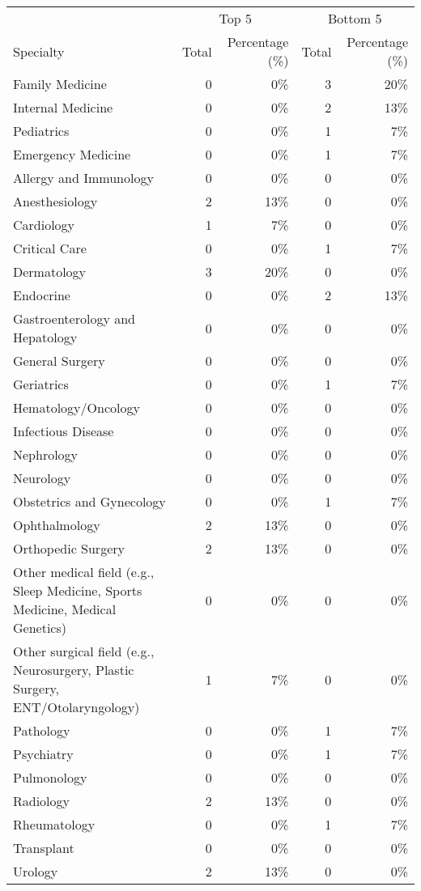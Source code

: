 \begin{tabular}{lrrrr}\toprule
 & \multicolumn{2}{c}{Top 5} & \multicolumn{2}{c}{Bottom 5} \\
\cmidrule(lr){2-3} \cmidrule(lr){4-5}
Specialty & Total & Percentage (\%) & Total & Percentage (\%) \\ \midrule
Family Medicine & 0 & 0\% & 3 & 20\% \\
Internal Medicine & 0 & 0\% & 2 & 13\% \\
Pediatrics & 0 & 0\% & 1 & 7\% \\
\midrule
Emergency Medicine & 0 & 0\% & 1 & 7\% \\
\midrule
Allergy and Immunology & 0 & 0\% & 0 & 0\% \\
Anesthesiology & 2 & 13\% & 0 & 0\% \\
Cardiology & 1 & 7\% & 0 & 0\% \\
Critical Care & 0 & 0\% & 1 & 7\% \\
Dermatology & 3 & 20\% & 0 & 0\% \\
Endocrine & 0 & 0\% & 2 & 13\% \\
Gastroenterology and Hepatology & 0 & 0\% & 0 & 0\% \\
General Surgery & 0 & 0\% & 0 & 0\% \\
Geriatrics & 0 & 0\% & 1 & 7\% \\
Hematology/Oncology & 0 & 0\% & 0 & 0\% \\
Infectious Disease & 0 & 0\% & 0 & 0\% \\
Nephrology & 0 & 0\% & 0 & 0\% \\
Neurology & 0 & 0\% & 0 & 0\% \\
Obstetrics and Gynecology & 0 & 0\% & 1 & 7\% \\
Ophthalmology & 2 & 13\% & 0 & 0\% \\
Orthopedic Surgery & 2 & 13\% & 0 & 0\% \\
Other medical field (e.g., Sleep Medicine, Sports Medicine, Medical Genetics) & 0 & 0\% & 0 & 0\% \\
Other surgical field (e.g., Neurosurgery, Plastic Surgery, ENT/Otolaryngology) & 1 & 7\% & 0 & 0\% \\
Pathology & 0 & 0\% & 1 & 7\% \\
Psychiatry & 0 & 0\% & 1 & 7\% \\
Pulmonology & 0 & 0\% & 0 & 0\% \\
Radiology & 2 & 13\% & 0 & 0\% \\
Rheumatology & 0 & 0\% & 1 & 7\% \\
Transplant & 0 & 0\% & 0 & 0\% \\
Urology & 2 & 13\% & 0 & 0\% \\
\bottomrule\end{tabular}
